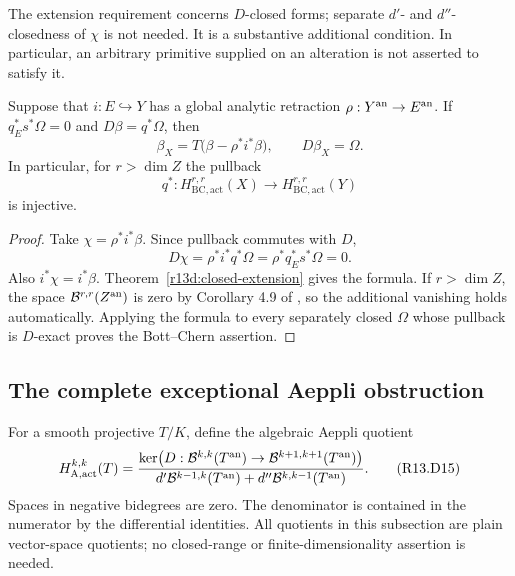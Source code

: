 The extension requirement concerns $D$-closed forms; separate
$d'$- and $d''$-closedness of $\chi$ is not needed.  It is a
substantive additional condition.  In particular, an arbitrary
primitive supplied on an alteration is not asserted to satisfy it.

\begin{corollary}
\label{r13d:global-retraction}
Suppose that $i:E\hookrightarrow Y$ has a global analytic retraction
$\rho:Y^{\rm an}\to E^{\rm an}$.  If
$q_E^*s^*\Omega=0$ and $D\beta=q^*\Omega$, then
\[
          \boxed{\quad
          \beta_X=T\bigl(\beta-\rho^*i^*\beta\bigr),
          \qquad D\beta_X=\Omega.\quad}
\tag{R13.D7}\label{r13d:retracted-primitive}
\]
In particular, for $r>\dim Z$ the pullback
\[
 q^*:H_{\mathrm{BC,act}}^{r,r}(X)
                       \longrightarrow H_{\mathrm{BC,act}}^{r,r}(Y)
\]
is injective.
\end{corollary}

\begin{proof}
Take $\chi=\rho^*i^*\beta$.  Since pullback commutes with $D$,
\[
             D\chi=\rho^*i^*q^*\Omega
                        =\rho^*q_E^*s^*\Omega=0.
\]
Also $i^*\chi=i^*\beta$.  Theorem~\ref{r13d:closed-extension}
gives the formula.  If $r>\dim Z$, the space
$\mathcal B^{r,r}(Z^{\rm an})$ is zero by Corollary 4.9 of \cite{M},
so the additional vanishing holds automatically.  Applying the formula
to every separately closed $\Omega$ whose pullback is $D$-exact
proves the Bott--Chern assertion.
\end{proof}

\subsection{The complete exceptional Aeppli obstruction}

For a smooth projective $T/K$, define the algebraic Aeppli quotient
\[
 H_{\mathrm A,\mathrm{act}}^{k,k}(T)
 =\frac{\ker\bigl(D:\mathcal B^{k,k}(T^{\rm an})
                          \to\mathcal B^{k+1,k+1}(T^{\rm an})\bigr)}
 {d'\mathcal B^{k-1,k}(T^{\rm an})+
          d''\mathcal B^{k,k-1}(T^{\rm an})}.
\tag{R13.D15}\label{r13d:aeppli}
\]
Spaces in negative bidegrees are zero.  The denominator is contained
in the numerator by the differential identities.  All quotients in
this subsection are plain vector-space quotients; no closed-range
or finite-dimensionality assertion is needed.

